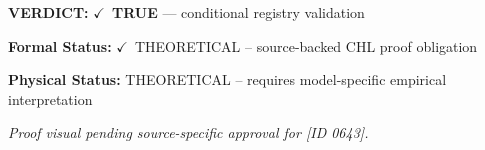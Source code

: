 \textbf{VERDICT:} \ensuremath{\checkmark}\ \textbf{TRUE} --- conditional registry validation

\textbf{Formal Status:} \ensuremath{\checkmark}\ THEORETICAL -- source-backed CHL proof obligation

\textbf{Physical Status:} THEORETICAL -- requires model-specific empirical interpretation
\par\vspace{0.45em}
\par
\vfill
\begingroup\footnotesize\itshape
Proof visual pending source-specific approval for [ID 0643].
\par\endgroup
\vfill
\endgroup
\endgroup
